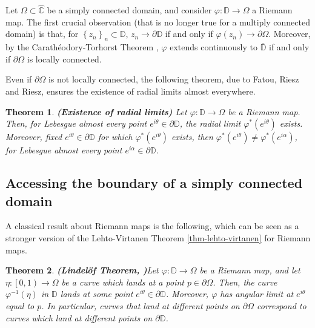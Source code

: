 \documentclass[11pt,a4paper,reqno]{amsart}
\theoremstyle{plain}
\newtheorem{thm}{Theorem}[section]
\theoremstyle{definition}
\theoremstyle{plain}
\def\Chat{\widehat{\mathbb{C}}}
\begin{document}
Let  $ \Omega\subset\Chat $ be a simply connected domain, and consider $ \varphi\colon\mathbb{D}\to \Omega $ a Riemann map. The first crucial observation (that is no longer true for a multiply connected domain) is that, for $ \left\lbrace z_n \right\rbrace _n\subset\mathbb{D}$, $ z_n\to\partial\mathbb{D} $ if and only if $ \varphi(z_n)\to\partial\Omega $.
Moreover, by the Carathéodory-Torhorst Theorem \cite[Thm. 2.1]{Pom92},  $ \varphi $ extends continuously to $ \overline{\mathbb{D}} $ if and only if $ \partial \Omega $ is locally connected.

Even if $\partial\Omega$ is not locally connected, the following theorem, due to Fatou, Riesz and Riesz, ensures the existence of radial limits almost everywhere.

\begin{thm}{\bf (Existence of radial limits) }\label{thm-FatouRiez}
	Let $ \varphi\colon\mathbb{D}\to \Omega$ be a Riemann map. Then, for Lebesgue almost every point $ e^{i\theta} \in\partial \mathbb{D}$, the radial limit $ \varphi^*(e^{i\theta} ) $ exists. Moreover, fixed $ e^{i\theta}\in \partial\mathbb{D} $ for which $ \varphi^*(e^{i\theta} ) $ exists, then $ \varphi^*(e^{i\theta} )\neq  \varphi^*(e^{i\alpha} )  $, for Lebesgue almost every point $ e^{i\alpha} \in\partial \mathbb{D}$.
\end{thm}


\subsection*{{Accessing the boundary of a simply connected domain}}
A classical result about Riemann maps is the following, which can be seen as a stronger version of the Lehto-Virtanen Theorem \ref{thm-lehto-virtanen} for Riemann maps.
\begin{thm}{\bf (Lindelöf Theorem, {\normalfont \cite[Thm. I.2.2]{CarlesonGamelin}})}\label{thm-lindelof}
	Let $ \varphi\colon\mathbb{D}\to \Omega$ be a Riemann map, and	let  $ \eta\colon \left[ 0,1\right) \to \Omega $  be a curve which lands at a point $ p\in\partial\Omega$. Then, the curve $ \varphi^{-1}(\eta) $ in $ \mathbb{D} $ lands at some point $e^{i\theta}\in\partial \mathbb{D} $. Moreover, $ \varphi $ has angular limit at $ e^{i\theta} $ equal to $ p $. In particular, curves that land at different points on $ \partial\Omega $ correspond to curves which land at different points on $ \partial\mathbb{D} $.
\end{thm}
\end{document}
